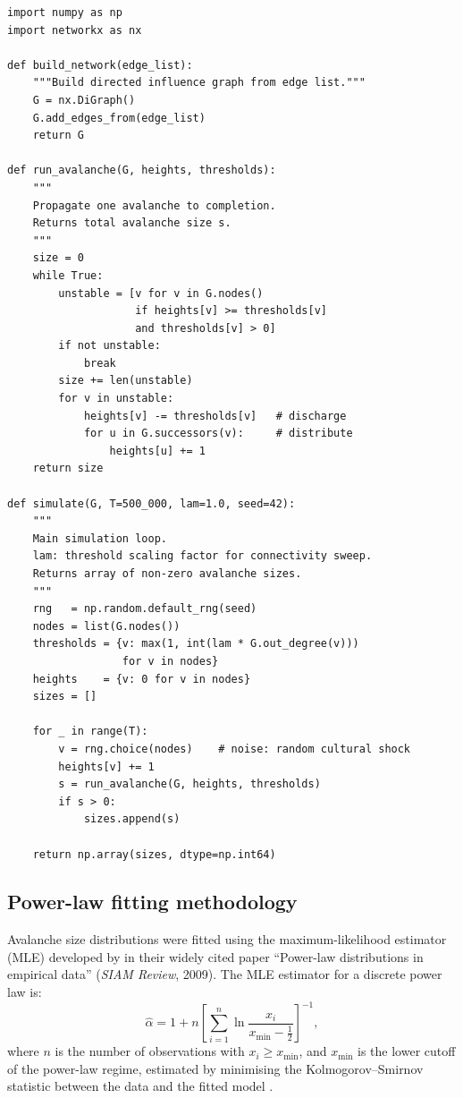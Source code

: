 \documentclass[12pt, a4paper]{article}
\begin{document}
\begin{lstlisting}[style=pythoncode, caption={Core simulation
  loop for the rock influence BTW sandpile.},
  label={lst:core}]
import numpy as np
import networkx as nx

def build_network(edge_list):
    """Build directed influence graph from edge list."""
    G = nx.DiGraph()
    G.add_edges_from(edge_list)
    return G

def run_avalanche(G, heights, thresholds):
    """
    Propagate one avalanche to completion.
    Returns total avalanche size s.
    """
    size = 0
    while True:
        unstable = [v for v in G.nodes()
                    if heights[v] >= thresholds[v]
                    and thresholds[v] > 0]
        if not unstable:
            break
        size += len(unstable)
        for v in unstable:
            heights[v] -= thresholds[v]   # discharge
            for u in G.successors(v):     # distribute
                heights[u] += 1
    return size

def simulate(G, T=500_000, lam=1.0, seed=42):
    """
    Main simulation loop.
    lam: threshold scaling factor for connectivity sweep.
    Returns array of non-zero avalanche sizes.
    """
    rng   = np.random.default_rng(seed)
    nodes = list(G.nodes())
    thresholds = {v: max(1, int(lam * G.out_degree(v)))
                  for v in nodes}
    heights    = {v: 0 for v in nodes}
    sizes = []

    for _ in range(T):
        v = rng.choice(nodes)    # noise: random cultural shock
        heights[v] += 1
        s = run_avalanche(G, heights, thresholds)
        if s > 0:
            sizes.append(s)

    return np.array(sizes, dtype=np.int64)
\end{lstlisting}

\subsection{Power-law fitting methodology}

Avalanche size distributions were fitted using the
maximum-likelihood estimator (MLE) developed by
\citet{clauset2009} in their widely cited paper
``Power-law distributions in empirical data''
(\textit{SIAM Review}, 2009).
The MLE estimator for a discrete power law is:
\begin{equation}
  \hat{\alpha} = 1 + n\left[
    \sum_{i=1}^{n} \ln\frac{x_i}{x_{\min} - \tfrac{1}{2}}
  \right]^{-1},
  \label{eq:mle}
\end{equation}
where $n$ is the number of observations with
$x_i \geq x_{\min}$, and $x_{\min}$ is the lower cutoff
of the power-law regime, estimated by minimising the
Kolmogorov--Smirnov statistic between the data and the fitted
model \citep{clauset2009}.
\end{document}
